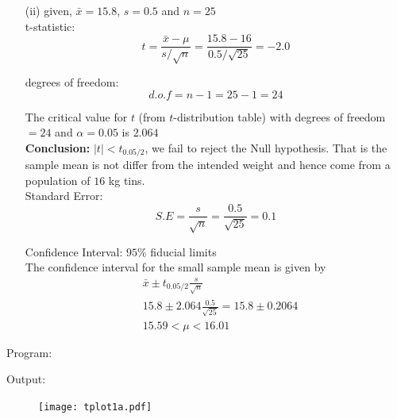 \documentclass[a4paper,11pt,openright]{report}
\begin{document}
\begin{enumerate}
\begin{enumerate}
\vspace{0.5cm}

\item[(ii)] given, $\bar x = 15.8$, $s = 0.5$ and $n = 25$ \\

t-statistic:
\begin{equation*}
t = \frac{\bar x - \mu}{s/\sqrt{n}}
  = \frac{15.8 - 16}{0.5/\sqrt{25}}
  = -2.0
\end{equation*}	

degrees of freedom:
\begin{equation*}
d.o.f = n - 1 = 25 - 1 = 24
\end{equation*}

The critical value for $t$ (from $t$-distribution table) with degrees of freedom $= 24$ and
$\alpha = 0.05$ is $2.064$ \\

\textbf{Conclusion:} $|t| < t_{0.05/2}$, we fail to reject the Null hypothesis. That is the
sample mean is not differ from the intended weight and hence come from a population of $16$ 
kg tins. \\

Standard Error:
\begin{equation*}
S.E = \frac{s}{\sqrt{n}} = \frac{0.5}{\sqrt{25}} = 0.1
\end{equation*} 

Confidence Interval: $95\%$ fiducial limits \\
The confidence interval for the small sample mean is given by
\begin{equation*}
\begin{split}
&\bar x \pm t_{0.05/2} \frac{s}{\sqrt{n}} \\
&15.8 \pm 2.064 \frac{0.5}{\sqrt{25}} = 15.8 \pm 0.2064 \\
&15.59 < \mu < 16.01
\end{split}
\end{equation*}

\end{enumerate}

\vspace{1cm}

Program:


\vspace{0.5cm}

Output:


\begin{figure}[ht!]
\texttt{[image: tplot1a.pdf]}
\centering
\end{figure}


\end{enumerate}
\end{document}
